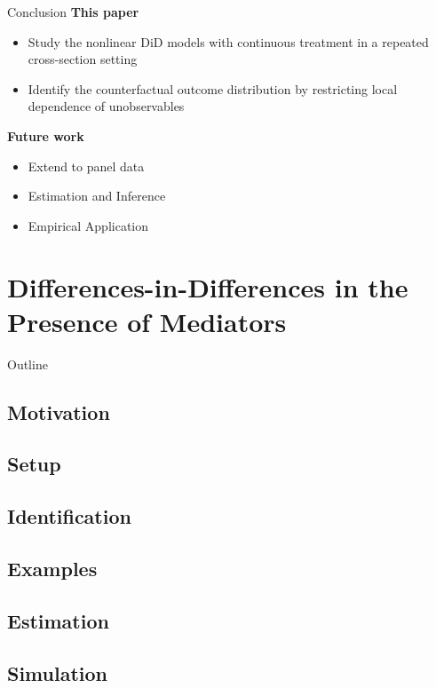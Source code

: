 \documentclass[aspectratio=1610, 9pt]{beamer}
\begin{document}
\begin{frame}{Conclusion}
\textbf{This paper}
\vspace{0.1cm}
    \begin{itemize}
        \item Study the nonlinear DiD models with continuous treatment in a repeated cross-section setting
        \item Identify the counterfactual outcome distribution by restricting local dependence of unobservables
        
    \end{itemize}
\vspace{0.6cm}
    \textbf{Future work}
    \vspace{0.1cm}
    \begin{itemize}
        \item  Extend to panel data
      \item Estimation and Inference
        \item Empirical Application

    \end{itemize}
\end{frame}


\section{Differences-in-Differences in the Presence of Mediators}
\begin{frame}{Outline}
    \tableofcontents[sectionstyle=show/shaded]
\end{frame}

\subsection*{Motivation}
\subsection*{Setup}
\subsection*{Identification}
\subsection*{Examples}
\subsection*{Estimation}
\subsection*{Simulation}
\end{document}
